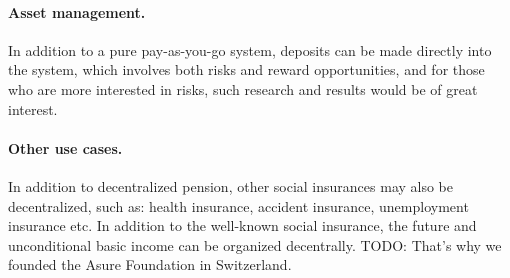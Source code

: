 \paragraph{Asset management.} In addition to a pure pay-as-you-go system, deposits can be made directly into the system, which involves both risks and reward opportunities, and for those who are more interested in risks, such research and results would be of great interest.

\paragraph{Other use cases.} In addition to decentralized pension, other social insurances may also be decentralized, such as: health insurance, accident insurance, unemployment insurance etc. In addition to the well-known social insurance, the future and unconditional basic income can be organized decentrally. TODO: That's why we founded the Asure Foundation in Switzerland.

